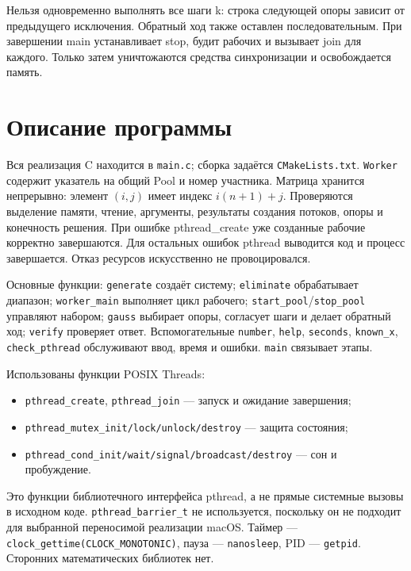 Нельзя одновременно выполнять все шаги k: строка следующей опоры зависит от
предыдущего исключения. Обратный ход также оставлен последовательным.
При завершении main устанавливает stop, будит рабочих и вызывает join для каждого.
Только затем уничтожаются средства синхронизации и освобождается память.

\section{Описание программы}
Вся реализация C находится в \texttt{main.c}; сборка задаётся \texttt{CMakeLists.txt}.
\texttt{Worker} содержит указатель на общий Pool и номер участника.
Матрица хранится непрерывно: элемент $(i,j)$ имеет индекс $i(n+1)+j$.
Проверяются выделение памяти, чтение, аргументы, результаты создания потоков,
опоры и конечность решения. При ошибке pthread\_create уже созданные рабочие
корректно завершаются. Для остальных ошибок pthread выводится код и процесс
завершается. Отказ ресурсов искусственно не провоцировался.

Основные функции: \texttt{generate} создаёт систему; \texttt{eliminate}
обрабатывает диапазон; \texttt{worker\_main} выполняет цикл рабочего;
\texttt{start\_pool}/\texttt{stop\_pool} управляют набором;
\texttt{gauss} выбирает опоры, согласует шаги и делает обратный ход;
\texttt{verify} проверяет ответ. Вспомогательные \texttt{number}, \texttt{help},
\texttt{seconds}, \texttt{known\_x}, \texttt{check\_pthread}
обслуживают ввод, время и ошибки. \texttt{main} связывает этапы.

Использованы функции POSIX Threads:
\begin{itemize}[nosep]
\item \texttt{pthread\_create}, \texttt{pthread\_join} --- запуск и ожидание завершения;
\item \texttt{pthread\_mutex\_init/lock/unlock/destroy} --- защита состояния;
\item \texttt{pthread\_cond\_init/wait/signal/broadcast/destroy} --- сон и пробуждение.
\end{itemize}
Это функции библиотечного интерфейса pthread, а не прямые системные вызовы
в исходном коде. \texttt{pthread\_barrier\_t} не используется, поскольку
он не подходит для выбранной переносимой реализации macOS.
Таймер --- \texttt{clock\_gettime(CLOCK\_MONOTONIC)}, пауза ---
\texttt{nanosleep}, PID --- \texttt{getpid}. Сторонних математических библиотек нет.

